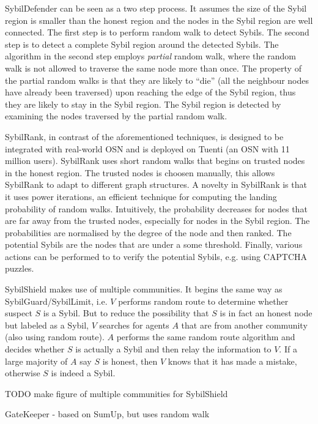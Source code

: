 SybilDefender\cite{wei2012sybildefender} can be seen as a two step process. It
assumes the size of the Sybil region is smaller than the honest region and the
nodes in the Sybil region are well connected. The first step is to perform
random walk to detect Sybils. The second step is to detect a complete Sybil
region around the detected Sybils. The algorithm in the second step employs
\emph{partial} random walk, where the random walk is not allowed to traverse the
same node more than once. The property of the partial random walks is that they
are likely to ``die'' (all the neighbour nodes have already been traversed) upon
reaching the edge of the Sybil region, thus they are likely to stay in the Sybil
region. The Sybil region is detected by examining the nodes traversed by the
partial random walk.

SybilRank, in contrast of the aforementioned techniques, is designed to be
integrated with real-world OSN and is deployed on Tuenti (an OSN with 11 million
users)\cite{cao2012aiding}. SybilRank uses short random walks that begins on
trusted nodes in the honest region. The trusted nodes is choosen manually, this
allows SybilRank to adapt to different graph structures. A novelty in SybilRank
is that it uses power iterations, an efficient technique for computing the
landing probability of random walks. Intuitively, the probability decreases for
nodes that are far away from the trusted nodes, especially for nodes in the
Sybil region. The probabilities are normalised by the degree of the node and
then ranked. The potential Sybils are the nodes that are under a some threshold.
Finally, various actions can be performed to to verify the potential Sybils,
e.g. using CAPTCHA puzzles.

SybilShield\cite{shi2013sybilshield} makes use of multiple communities. It
begins the same way as SybilGuard/SybilLimit, i.e. $V$ performs random route to
determine whether suspect $S$ is a Sybil. But to reduce the possibility that $S$
is in fact an honest node but labeled as a Sybil, $V$ searches for agents $A$
that are from another community (also using random route). $A$ performs the same
random route algorithm and decides whether $S$ is actually a Sybil and then
relay the information to $V$. If a large majority of $A$ say $S$ is honest, then
$V$ knows that it has made a mistake, otherwise $S$ is indeed a Sybil.

TODO make figure of multiple communities for SybilShield

GateKeeper\cite{tran2011optimal} - based on SumUp, but uses random walk

